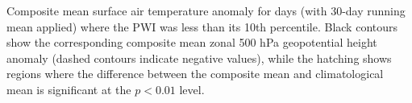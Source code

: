 \label{fig:tas_zonal_composite}
Composite mean surface air temperature anomaly for days (with 30-day running mean applied) where the PWI was less than its 10th percentile. Black contours show the corresponding composite mean zonal 500 hPa geopotential height anomaly (dashed contours indicate negative values), while the hatching shows regions where the difference between the composite mean and climatological mean is significant at the $p < 0.01$ level. 